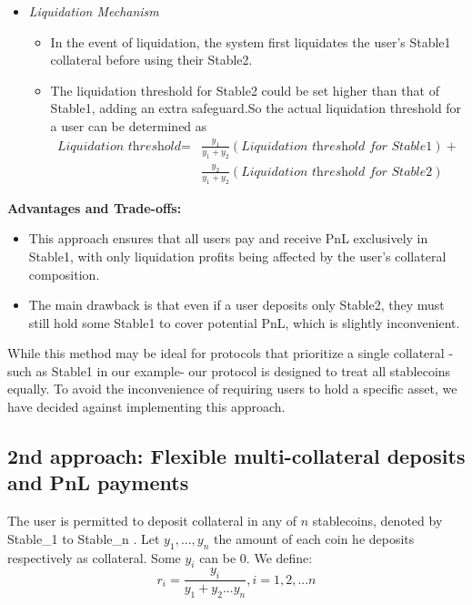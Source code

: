 \documentclass{article}
\begin{document}
\begin{itemize}
	
\item \textit{Liquidation Mechanism}
	\begin{itemize}
	\item In the event of liquidation, the system first liquidates the user's Stable1 collateral before using their Stable2.
 \item The liquidation threshold for Stable2 could be set higher than that of Stable1, adding an extra safeguard.So the actual liquidation threshold for a user can be determined as 
	\begin{align*}
     \textit{Liquidation threshold} = &\frac{y_1}{y_1+y_2}(\textit{Liquidation threshold for Stable1}) +\\
     & \frac{y_2}{y_1+y_2}(\textit{Liquidation threshold for Stable2})
    \end{align*}
	\end{itemize}
\end{itemize}

\textbf{Advantages and Trade-offs:}
\begin{itemize}
\item This approach ensures that all users pay and receive PnL exclusively in Stable1, with only liquidation profits being affected by the user's collateral composition.
\item The main drawback is that even if a user deposits only Stable2, they must still hold some Stable1 to cover potential PnL, which is slightly inconvenient.
\end{itemize} 

While this method may be ideal for protocols that prioritize a single collateral -such as Stable1 in our example- our protocol is designed to treat all stablecoins equally. To avoid the inconvenience of requiring users to hold a specific asset, we have decided against implementing this approach.




\subsection{2nd approach: Flexible multi-collateral deposits and PnL payments}

The user is permitted to deposit collateral in any of $n$ stablecoins, denoted by Stable\_1 to Stable\_n . Let $y_1,...,y_n$ the amount of each coin he deposits respectively as collateral. Some $y_i$ can be 0. We define:
\begin{equation*}
r_i = \frac{y_i}{y_1 +y_2...y_n}, i=1,2,...n
\end{equation*}
\end{document}
